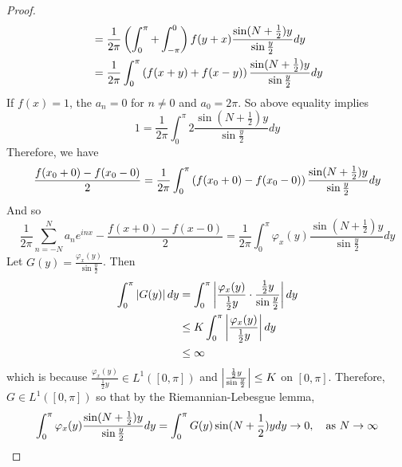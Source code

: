 \begin{enumerate}[label=\arabic*.]
\begin{proof}
\begin{equation*}
\begin{aligned}
				&= \frac{1}{2\pi} \left(\int_0^{\pi}+\int_{-\pi}^{0}\right) f(y+x)\frac{\sin(N+\frac{1}{2})y}{\sin \frac{y}{2}}dy \\
				&=	\frac{1}{2\pi} \int_0^{\pi} \left(f(x+y)+f(x-y)\right)\frac{\sin(N+\frac{1}{2})y}{\sin \frac{y}{2}}dy
			\end{aligned}
		\end{equation*}
		If $f(x) = 1$, the $a_n = 0$ for $n \neq 0$ and $a_0 = 2\pi$. So above equality implies
		\begin{equation*}
			1 = \frac{1}{2\pi} \int_0^{\pi} 2\frac{\sin(N+\frac{1}{2})y}{\sin \frac{y}{2}}dy
		\end{equation*}
		Therefore, we have
		\begin{equation*}
			\frac{f(x_0 + 0) - f(x_0 - 0)}{2} = \frac{1}{2\pi} \int_0^{\pi} \left(f(x_0 + 0) - f(x_0 - 0)\right)\frac{\sin(N+\frac{1}{2})y}{\sin \frac{y}{2}}dy
		\end{equation*}
		And so
		\begin{equation*}
			\frac{1}{2\pi} \sum_{n = -N}^N a_ne^{inx} - \frac{f(x + 0) - f(x - 0)}{2} =  \frac{1}{2\pi} \int_0^{\pi} \varphi_x(y) \frac{\sin(N+\frac{1}{2})y}{\sin \frac{y}{2}}dy
		\end{equation*}
		Let $G(y) = \frac{\varphi_x(y)}{\sin \frac{y}{2}}$. Then
		\begin{equation*}
			\begin{aligned}
				\int_0^{\pi}\left\lvert G(y)\right\lvert dy &= \int_0^{\pi}\left\lvert\frac{\varphi_x(y)}{\frac{1}{2}y} \cdot \frac{\frac{1}{2}y}{\sin \frac{y}{2}}\right\lvert dy \\
				&\leq K \int_0^{\pi}\left\lvert\frac{\varphi_x(y)}{\frac{1}{2}y}\right\lvert dy \\
				&\leq \infty
			\end{aligned}
		\end{equation*}
		which is because $\frac{\varphi_x(y)}{\frac{1}{2}y} \in L^1([0,\pi])$ and $\left\lvert\frac{\frac{1}{2}y}{\sin \frac{y}{2}}\right\lvert \leq K$ on $[0,\pi]$. Therefore, $G \in L^1([0,\pi])$ so that by the Riemannian-Lebesgue lemma,
		\begin{equation*}
			\int_0^{\pi} \varphi_x(y) \frac{\sin(N+\frac{1}{2})y}{\sin \frac{y}{2}}dy = \int_0^{\pi}  G(y)\sin(N+\frac{1}{2})ydy \rightarrow 0,\quad \text{as } N \rightarrow \infty
		\end{equation*}
	\end{proof}


\end{enumerate}
